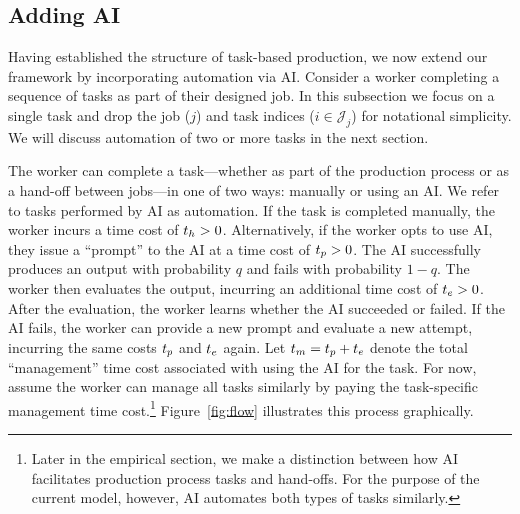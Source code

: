 \documentclass{article}
\theoremstyle{plain}
\theoremstyle{plain}
\begin{document}
\subsection{Adding AI}
Having established the structure of task-based production, we now extend our framework by incorporating automation via AI.
Consider a worker completing a sequence of tasks as part of their designed job.
In this subsection we focus on a single task and drop the job ($j$) and task indices ($i \in \mathcal{J}_j$) for notational simplicity.
We will discuss automation of two or more tasks in the next section.

The worker can complete a task---whether as part of the production process or as a hand-off between jobs---in one of two ways: manually or using an AI.
We refer to tasks performed by AI as automation.
If the task is completed manually, the worker incurs a time cost of $t_{h} > 0$.
Alternatively, if the worker opts to use AI, they issue a ``prompt'' to the AI at a time cost of $t_{p} > 0$.
The AI successfully produces an output with probability $q$ and fails with probability $1-q$.
The worker then evaluates the output, incurring an additional time cost of $t_{e} > 0$.
After the evaluation, the worker learns whether the AI succeeded or failed.
If the AI fails, the worker can provide a new prompt and evaluate a new attempt, incurring the same costs $t_{p}$ and $t_{e}$ again.
Let $t_{m} = t_{p} + t_{e}$ denote the total ``management'' time cost associated with using the AI for the task.
For now, assume the worker can manage all tasks similarly by paying the task-specific management time cost.\footnote{Later in the empirical section, we make a distinction between how AI facilitates production process tasks and hand-offs. For the purpose of the current model, however, AI automates both types of tasks similarly.}
Figure~\ref{fig:flow} illustrates this process graphically.
\end{document}

